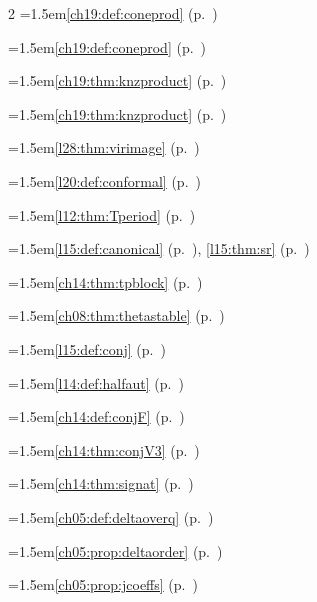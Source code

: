 \begin{multicols}{2}
\hangindent=1.5em\quad \ref{ch19:def:coneprod} (p.~\pageref{ch19:def:coneprod})\par
\hangindent=1.5em\quad \ref{ch19:def:coneprod} (p.~\pageref{ch19:def:coneprod})\par
\hangindent=1.5em\quad \ref{ch19:thm:knzproduct} (p.~\pageref{ch19:thm:knzproduct})\par
\hangindent=1.5em\quad \ref{ch19:thm:knzproduct} (p.~\pageref{ch19:thm:knzproduct})\par
\hangindent=1.5em\quad \ref{l28:thm:virimage} (p.~\pageref{l28:thm:virimage})\par
\hangindent=1.5em\quad \ref{l20:def:conformal} (p.~\pageref{l20:def:conformal})\par
\hangindent=1.5em\quad \ref{l12:thm:Tperiod} (p.~\pageref{l12:thm:Tperiod})\par
\hangindent=1.5em\quad \ref{l15:def:canonical} (p.~\pageref{l15:def:canonical}), \ref{l15:thm:sr} (p.~\pageref{l15:thm:sr})\par
\hangindent=1.5em\quad \ref{ch14:thm:tpblock} (p.~\pageref{ch14:thm:tpblock})\par
\hangindent=1.5em\quad \ref{ch08:thm:thetastable} (p.~\pageref{ch08:thm:thetastable})\par
\hangindent=1.5em\quad \ref{l15:def:conj} (p.~\pageref{l15:def:conj})\par
\hangindent=1.5em\quad \ref{l14:def:halfaut} (p.~\pageref{l14:def:halfaut})\par
\hangindent=1.5em\quad \ref{ch14:def:conjF} (p.~\pageref{ch14:def:conjF})\par
\hangindent=1.5em\quad \ref{ch14:thm:conjV3} (p.~\pageref{ch14:thm:conjV3})\par
\hangindent=1.5em\quad \ref{ch14:thm:signat} (p.~\pageref{ch14:thm:signat})\par
\hangindent=1.5em\quad \ref{ch05:def:deltaoverq} (p.~\pageref{ch05:def:deltaoverq})\par
\hangindent=1.5em\quad \ref{ch05:prop:deltaorder} (p.~\pageref{ch05:prop:deltaorder})\par
\hangindent=1.5em\quad \ref{ch05:prop:jcoeffs} (p.~\pageref{ch05:prop:jcoeffs})\par

\end{multicols}
